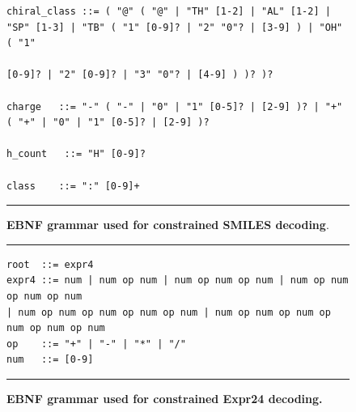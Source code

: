 \documentclass{article}
\theoremstyle{plain}
\theoremstyle{definition}
\theoremstyle{remark}
\begin{document}
\begin{figure}[!htbp]
\begin{minipage}{0.97\linewidth}
\begin{verbatim}
chiral_class ::= ( "@" ( "@" | "TH" [1-2] | "AL" [1-2] | "SP" [1-3] | "TB" ( "1" [0-9]? | "2" "0"? | [3-9] ) | "OH" ( "1"

[0-9]? | "2" [0-9]? | "3" "0"? | [4-9] ) )? )?

charge   ::= "-" ( "-" | "0" | "1" [0-5]? | [2-9] )? | "+" ( "+" | "0" | "1" [0-5]? | [2-9] )?

h_count   ::= "H" [0-9]?

class    ::= ":" [0-9]+
\end{verbatim}
\vspace{2pt}\hrule
\end{minipage}
\caption{\textbf{EBNF grammar used for constrained SMILES decoding}.}
\label{fig:ebnf_smiles}
\end{figure}


\begin{figure}[!htbp]
\centering
\begin{minipage}{0.70\linewidth}
\hrule \vspace{3pt}
\scriptsize
\begin{verbatim}
root  ::= expr4
expr4 ::= num | num op num | num op num op num | num op num op num op num
| num op num op num op num op num | num op num op num op num op num op num
op    ::= "+" | "-" | "*" | "/"
num   ::= [0-9]
\end{verbatim}
\vspace{2pt}\hrule
\end{minipage}
\caption{\textbf{EBNF grammar used for constrained Expr24 decoding.}}
\label{fig:ebnf_expr24}
\end{figure}
\end{document}

